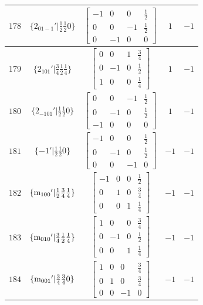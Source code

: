 \documentclass[fleqn,8pt]{jsarticle}
\begin{document}
\begin{longtable}{ccccc}
$ 178 $ & $ \{2{}_{01-1}{}'|\frac{1}{2} \frac{1}{2} 0\} $ & $ \begin{bmatrix} -1 & 0 & 0 & \frac{1}{2} \\ 0 & 0 & -1 & \frac{1}{2} \\ 0 & -1 & 0 & 0 \end{bmatrix} $ & $ 1 $ & $ -1 $ \\ \hline
$ 179 $ & $ \{2{}_{101}{}'|\frac{3}{4} \frac{1}{2} \frac{1}{4}\} $ & $ \begin{bmatrix} 0 & 0 & 1 & \frac{3}{4} \\ 0 & -1 & 0 & \frac{1}{2} \\ 1 & 0 & 0 & \frac{1}{4} \end{bmatrix} $ & $ 1 $ & $ -1 $ \\ \hline
$ 180 $ & $ \{2{}_{-101}{}'|\frac{1}{2} \frac{1}{2} 0\} $ & $ \begin{bmatrix} 0 & 0 & -1 & \frac{1}{2} \\ 0 & -1 & 0 & \frac{1}{2} \\ -1 & 0 & 0 & 0 \end{bmatrix} $ & $ 1 $ & $ -1 $ \\ \hline
$ 181 $ & $ \{-1{}'|\frac{1}{2} \frac{1}{2} 0\} $ & $ \begin{bmatrix} -1 & 0 & 0 & \frac{1}{2} \\ 0 & -1 & 0 & \frac{1}{2} \\ 0 & 0 & -1 & 0 \end{bmatrix} $ & $ -1 $ & $ -1 $ \\ \hline
$ 182 $ & $ \{{\rm m}_{100}{}'|\frac{1}{2} \frac{3}{4} \frac{1}{4}\} $ & $ \begin{bmatrix} -1 & 0 & 0 & \frac{1}{2} \\ 0 & 1 & 0 & \frac{3}{4} \\ 0 & 0 & 1 & \frac{1}{4} \end{bmatrix} $ & $ -1 $ & $ -1 $ \\ \hline
$ 183 $ & $ \{{\rm m}_{010}{}'|\frac{3}{4} \frac{1}{2} \frac{1}{4}\} $ & $ \begin{bmatrix} 1 & 0 & 0 & \frac{3}{4} \\ 0 & -1 & 0 & \frac{1}{2} \\ 0 & 0 & 1 & \frac{1}{4} \end{bmatrix} $ & $ -1 $ & $ -1 $ \\ \hline
$ 184 $ & $ \{{\rm m}_{001}{}'|\frac{3}{4} \frac{3}{4} 0\} $ & $ \begin{bmatrix} 1 & 0 & 0 & \frac{3}{4} \\ 0 & 1 & 0 & \frac{3}{4} \\ 0 & 0 & -1 & 0 \end{bmatrix} $ & $ -1 $ & $ -1 $ \\ \hline

\end{longtable}
\end{document}
